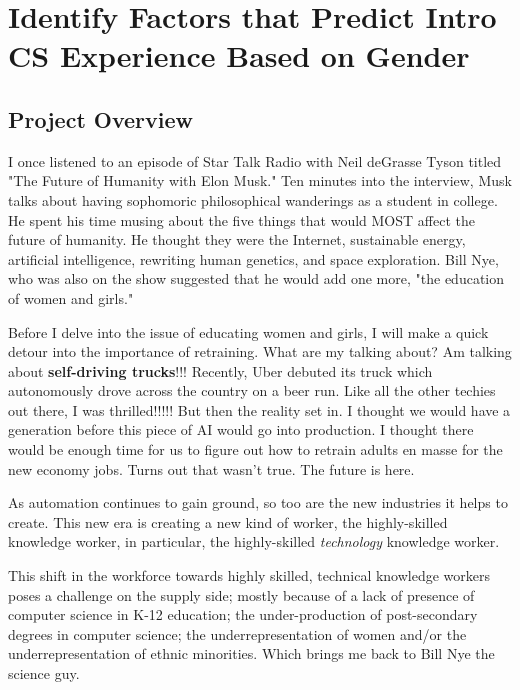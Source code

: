 
\chapter*{Identify Factors that Predict Intro CS Experience Based on Gender}

\section*{Project Overview}

I once listened to an episode of Star Talk Radio with Neil deGrasse Tyson titled "The Future of Humanity with Elon Musk." Ten minutes into the interview, Musk talks about having sophomoric philosophical wanderings as a student in college. He spent his time musing about the five things that would MOST affect the future of humanity. He thought they were the Internet, sustainable energy, artificial intelligence, rewriting human genetics, and space exploration. Bill Nye, who was also on the show suggested that he would add one more, "the education of women and girls."

Before I delve into the issue of educating women and girls, I will make a quick detour into the importance of retraining. What are my talking about? Am talking about \textbf{self-driving trucks}!!! Recently, Uber debuted its truck which autonomously drove across the country on a beer run. Like all the other techies out there, I was thrilled!!!!! But then the reality set in. I thought we would have a generation before this piece of AI would go into production. I thought there would be enough time for us to figure out how to retrain adults en masse for the new economy jobs. Turns out that wasn't true. The future is here.

As automation continues to gain ground, so too are the new industries it helps to create. This new era is creating a new kind of worker, the highly-skilled knowledge worker, in particular, the highly-skilled \emph{technology} knowledge worker.

This shift in the workforce towards highly skilled, technical knowledge workers poses a challenge on the supply side; mostly because of a lack of presence of computer science in K-12 education; the under-production of post-secondary degrees in computer science;  the underrepresentation of women and/or the underrepresentation of ethnic minorities. Which brings me back to Bill Nye the science guy.

